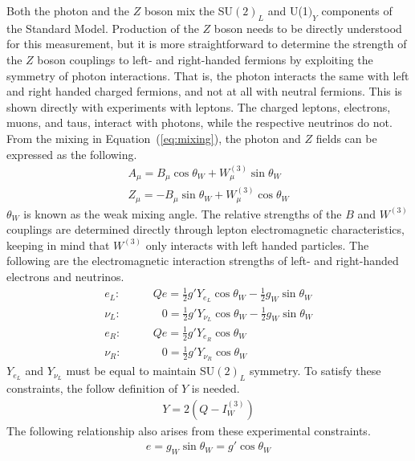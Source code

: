 Both the photon and the $Z$ boson mix the SU$(2)_L$ and U(1$)_Y$ components of the Standard Model.
Production of the $Z$ boson needs to be directly understood for this measurement,
but it is more straightforward to determine the strength of the $Z$ boson couplings to left-
and right-handed fermions by exploiting the symmetry of photon
interactions. 
That is, the photon interacts the same with left and right handed charged fermions,
and not at all with neutral fermions.
This is shown directly with experiments with leptons.
The charged leptons, electrons, muons, and taus, interact with photons,
while the respective neutrinos do not.
From the mixing in Equation~(\ref{eq:mixing}),
the photon and $Z$ fields can be expressed as the following.
\begin{gather}
  A_\mu = B_\mu \cos \theta_W + W_\mu^{(3)} \sin \theta_W \\
  Z_\mu = - B_\mu \sin \theta_W + W_\mu^{(3)} \cos \theta_W \label{eq:z-force}
\end{gather}
$\theta_W$ is known as the weak mixing angle.
The relative strengths of the $B$ and $W^{(3)}$ couplings
are determined directly through lepton electromagnetic characteristics,
keeping in mind that $W^{(3)}$ only interacts with left handed particles.
The following are the electromagnetic interaction strengths of left- and right-handed electrons and neutrinos.
\begin{align}
  e_L:& \qquad Qe = \frac12 g' Y_{e_L} \cos \theta_W - \frac12 g_W \sin \theta_W \\
  \nu_L:& \qquad \phantom{Q}0 = \frac12 g' Y_{\nu_L} \cos \theta_W - \frac12 g_W \sin \theta_W \\
  e_R:& \qquad Qe = \frac12 g' Y_{e_R} \cos \theta_W \\
  \nu_R:& \qquad \phantom{Q}0 = \frac12 g' Y_{\nu_R} \cos \theta_W
\end{align}
$Y_{e_L}$ and $Y_{\nu_L}$ must be equal to maintain SU$(2)_L$ symmetry.
To satisfy these constraints, the follow definition of $Y$ is needed.
\begin{gather}
  Y = 2\left(Q - I_W^{(3)}\right)
\end{gather}
The following relationship also arises from these experimental constraints.
\begin{gather}
  e = g_W \sin \theta_W = g' \cos \theta_W
\end{gather}

